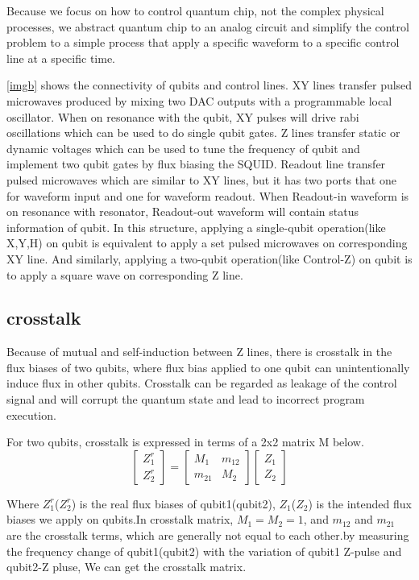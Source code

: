 Because we focus on how to control quantum chip, not the complex physical processes, 
we abstract quantum chip to an analog circuit and simplify the control problem to a simple process that apply a specific waveform to a specific control line at a specific time.



\ref{imgb} shows the connectivity of qubits and control lines. 
XY lines transfer pulsed microwaves produced by mixing two DAC outputs with a programmable local oscillator. When on resonance with the qubit, XY pulses 
will drive rabi oscillations which can be used to do single qubit gates. 
Z lines transfer static or dynamic voltages which can be used to tune the frequency of qubit and implement two qubit gates by flux biasing the SQUID. 
Readout line transfer pulsed microwaves which are similar to XY lines, but it has two ports that one for waveform input and one for waveform readout. 
When Readout-in waveform is on resonance with resonator, Readout-out waveform will contain status information of qubit.
In this structure, applying a single-qubit operation(like X,Y,H) on qubit is equivalent to apply a set pulsed microwaves on corresponding XY line. 
And similarly, applying a two-qubit operation(like Control-Z) on qubit is to apply a square wave on corresponding Z line.

\subsection{crosstalk}
Because of mutual and self-induction between Z lines, there is crosstalk in the flux biases of two qubits, where flux bias applied to one 
qubit can unintentionally induce flux in other qubits. 
Crosstalk can be regarded as leakage of the control signal and will corrupt the quantum state and lead to incorrect program execution.

For two qubits, crosstalk is expressed in terms of a 2x2 matrix M below.
\[ \begin{bmatrix} Z^r_1 \\ Z^r_2\end{bmatrix}=
\begin{bmatrix} M_1 & m_{12} \\ m_{21}  & M_2 \end{bmatrix} 
\begin{bmatrix} Z_1 \\ Z_2 \end{bmatrix}\]

Where $Z^r_1  $($Z^r_2 $) is the real flux biases of qubit1(qubit2), $Z_1  $($Z_2 $) is the intended flux biases we apply on qubits.In crosstalk matrix, $M_1=M_2=1 $, 
and $m_{12} $ and $m_{21} $ are the crosstalk terms, which are generally not equal to each other.by measuring the frequency change of qubit1(qubit2) with the variation 
of qubit1 Z-pulse and qubit2-Z pluse, We can get the crosstalk matrix.

